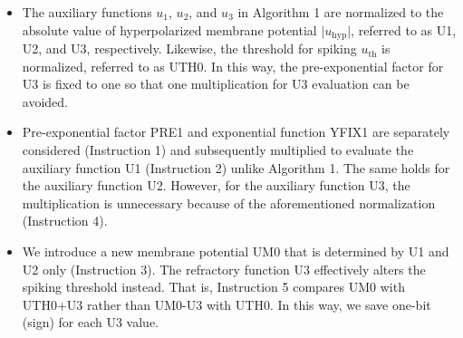 \documentclass[10pt,journal]{IEEEtran}
\begin{document}
\begin{itemize}
    \item The auxiliary functions $u_\textrm{1}$, $u_\textrm{2}$, and $u_\textrm{3}$ in Algorithm 1 are normalized to the absolute value of hyperpolarized membrane potential $\mathrm{\lvert}$$u_\textrm{hyp}$$\mathrm{\lvert}$, referred to as U1, U2, and U3, respectively. Likewise, the threshold for spiking $u_\textrm{th}$ is normalized, referred to as UTH0. In this way, the pre-exponential factor for U3 is fixed to one so that one multiplication for U3 evaluation can be avoided.
    \item Pre-exponential factor PRE1 and exponential function Y\textunderscore FIX1 are separately considered (Instruction 1) and subsequently multiplied to evaluate the auxiliary function U1 (Instruction 2) unlike Algorithm 1. The same holds for the auxiliary function U2. However, for the auxiliary function U3, the multiplication is unnecessary because of the aforementioned normalization (Instruction 4).
    \item We introduce a new membrane potential UM0 that is determined by U1 and U2 only (Instruction 3). The refractory function U3 effectively alters the spiking threshold instead. That is, Instruction 5 compares UM0 with UTH0+U3 rather than UM0-U3 with UTH0. In this way, we save one-bit (sign) for each U3 value. 
\end{itemize}
\end{document}
